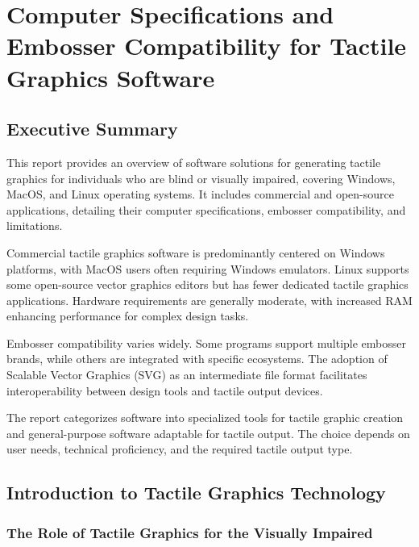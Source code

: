 \chapter{Computer Specifications and Embosser Compatibility for Tactile Graphics Software}

\section{Executive Summary}

This report provides an overview of software solutions for generating tactile graphics for individuals who are blind or visually impaired, covering Windows, MacOS, and Linux operating systems. It includes commercial and open-source applications, detailing their computer specifications, embosser compatibility, and limitations.

Commercial tactile graphics software is predominantly centered on Windows platforms, with MacOS users often requiring Windows emulators. Linux supports some open-source vector graphics editors but has fewer dedicated tactile graphics applications. Hardware requirements are generally moderate, with increased RAM enhancing performance for complex design tasks.

Embosser compatibility varies widely. Some programs support multiple embosser brands, while others are integrated with specific ecosystems. The adoption of Scalable Vector Graphics (SVG) as an intermediate file format facilitates interoperability between design tools and tactile output devices.

The report categorizes software into specialized tools for tactile graphic creation and general-purpose software adaptable for tactile output. The choice depends on user needs, technical proficiency, and the required tactile output type.

\section{Introduction to Tactile Graphics Technology}

\subsection{The Role of Tactile Graphics for the Visually Impaired}

